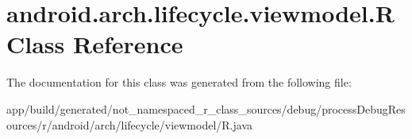 \hypertarget{classandroid_1_1arch_1_1lifecycle_1_1viewmodel_1_1_r}{}\section{android.\+arch.\+lifecycle.\+viewmodel.\+R Class Reference}
\label{classandroid_1_1arch_1_1lifecycle_1_1viewmodel_1_1_r}


The documentation for this class was generated from the following file\+:\begin{DoxyCompactItemize}
\item 
app/build/generated/not\+\_\+namespaced\+\_\+r\+\_\+class\+\_\+sources/debug/process\+Debug\+Resources/r/android/arch/lifecycle/viewmodel/R.\+java\end{DoxyCompactItemize}
